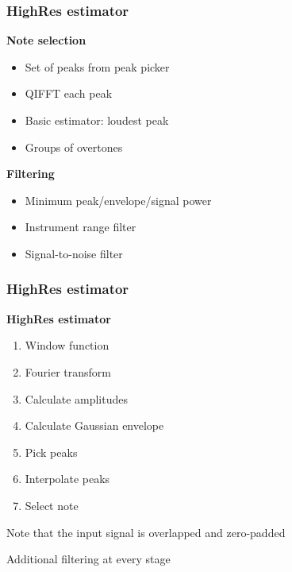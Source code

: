 \documentclass[table]{beamer}
\begin{document}
\begin{frame}
\frametitle{HighRes estimator}
    {\large \textbf{Note selection}}
    \begin{itemize}
        \item Set of peaks from peak picker
        \item QIFFT each peak
        \item Basic estimator: loudest peak
        \item Groups of overtones
    \end{itemize}
    \bigskip

    {\large \textbf{Filtering}}
    \begin{itemize}
        \item Minimum peak/envelope/signal power
        \item Instrument range filter
        \item Signal-to-noise filter
    \end{itemize}
\end{frame}


\begin{frame}
\frametitle{HighRes estimator}
    \large{\textbf{HighRes estimator}}
    \begin{enumerate}
        \item Window function
        \item Fourier transform
        \item Calculate amplitudes
        \item Calculate Gaussian envelope
        \item Pick peaks
        \item Interpolate peaks
        \item Select note
    \end{enumerate}
    \smallskip
    
    Note that the input signal is overlapped and zero-padded
    \smallskip

    Additional filtering at every stage
\end{frame}
\end{document}
